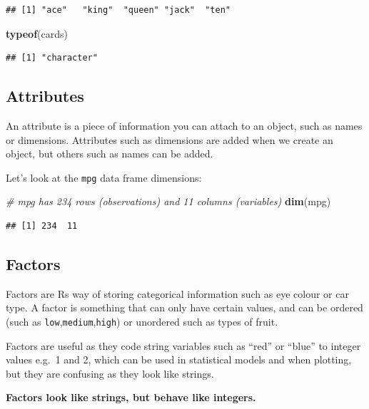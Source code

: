 \documentclass[12pt,]{book}
\newenvironment{Shaded}{\begin{snugshade}}{\end{snugshade}}
\newcommand{\KeywordTok}[1]{\textcolor[rgb]{0.13,0.29,0.53}{\textbf{#1}}}
\newcommand{\CommentTok}[1]{\textcolor[rgb]{0.56,0.35,0.01}{\textit{#1}}}
\newcommand{\NormalTok}[1]{#1}
\theoremstyle{definition}
\theoremstyle{definition}
\theoremstyle{definition}
\theoremstyle{remark}
\begin{document}
\begin{verbatim}
## [1] "ace"   "king"  "queen" "jack"  "ten"
\end{verbatim}

\begin{Shaded}
\begin{Highlighting}[]
\KeywordTok{typeof}\NormalTok{(cards)}
\end{Highlighting}
\end{Shaded}

\begin{verbatim}
## [1] "character"
\end{verbatim}

\subsection{Attributes}\label{attributes}

An attribute is a piece of information you can attach to an object, such
as names or dimensions. Attributes such as dimensions are added when we
create an object, but others such as names can be added.

Let's look at the \texttt{mpg} data frame dimensions:

\begin{Shaded}
\begin{Highlighting}[]
\CommentTok{# mpg has 234 rows (observations) and 11 columns (variables)}
\KeywordTok{dim}\NormalTok{(mpg)}
\end{Highlighting}
\end{Shaded}

\begin{verbatim}
## [1] 234  11
\end{verbatim}

\subsection{Factors}\label{factors}

Factors are Rs way of storing categorical information such as eye colour
or car type. A factor is something that can only have certain values,
and can be ordered (such as \texttt{low},\texttt{medium},\texttt{high})
or unordered such as types of fruit.

Factors are useful as they code string variables such as ``red'' or
``blue'' to integer values e.g.~1 and 2, which can be used in
statistical models and when plotting, but they are confusing as they
look like strings.

\textbf{Factors look like strings, but behave like integers.}
\end{document}

